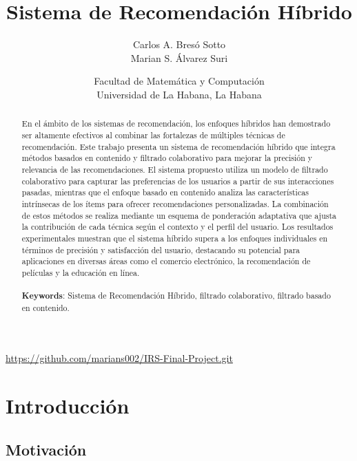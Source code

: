 \documentclass[a4paper,12pt]{report}
\begin{document}
\title{Sistema de Recomendación Híbrido}
\author{Carlos A. Bresó Sotto \\
Marian S. Álvarez Suri}

\urldef{\repo}\url{https://github.com/marians002/IRS-Final-Project.git}

\date{Facultad de Matemática y Computación \\ 
           Universidad de La Habana, La Habana 
           \\ \repo}

\maketitle

\begin{abstract}
    En el ámbito de los sistemas de recomendación, los enfoques híbridos han demostrado ser altamente efectivos al combinar las fortalezas de múltiples técnicas de recomendación. Este trabajo presenta un sistema de recomendación híbrido que integra métodos basados en contenido y filtrado colaborativo para mejorar la precisión y relevancia de las recomendaciones. El sistema propuesto utiliza un modelo de filtrado colaborativo para capturar las preferencias de los usuarios a partir de sus interacciones pasadas, mientras que el enfoque basado en contenido analiza las características intrínsecas de los ítems para ofrecer recomendaciones personalizadas. La combinación de estos métodos se realiza mediante un esquema de ponderación adaptativa que ajusta la contribución de cada técnica según el contexto y el perfil del usuario. Los resultados experimentales muestran que el sistema híbrido supera a los enfoques individuales en términos de precisión y satisfacción del usuario, destacando su potencial para aplicaciones en diversas áreas como el comercio electrónico, la recomendación de películas y la educación en línea.
\\
\\
    \textbf{Keywords}: Sistema de Recomendación Híbrido, filtrado colaborativo, filtrado basado en contenido.
\end{abstract}

\tableofcontents

\chapter{Introducción}
    \section{Motivación}
\end{document}
